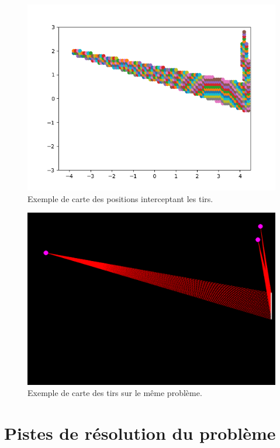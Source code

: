 \documentclass[12pt]{article}
\begin{document}
\begin{figure}[h!]
  \centering
  \includegraphics[width = 13cm]{terrain_placements.png}
  \caption{Exemple de carte des positions interceptant les tirs.}
  \label{figure:terrain_placements}
\end{figure}

\begin{figure}[h!]
  \centering
  \includegraphics[width = 13cm]{terrain_tirs.png}
  \caption{Exemple de carte des tirs sur le même problème.}
  \label{figure:terrain_tirs}
\end{figure}

\section{Pistes de résolution du problème}
\end{document}
